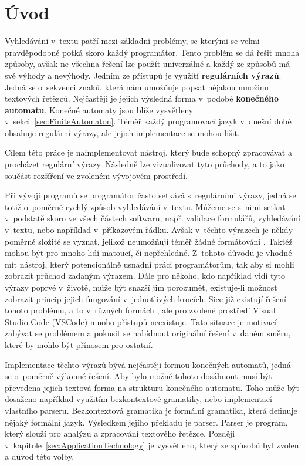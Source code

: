\chapter{Úvod}\label{sec:Introduction}

Vyhledávání v~textu patří mezi základní problémy, se kterými se velmi pravděpodobně potká skoro každý programátor. 
Tento problém se dá řešit mnoha způsoby, avšak ne všechna řešení lze použít univerzálně a každý ze způsobů má své výhody a nevýhody.
Jedním ze přístupů je využití \textbf{regulárních výrazů}. 
Jedná se o~sekvenci znaků, která nám umožňuje popsat nějakou množinu textových řetězců\cite{article_Bhatia}.
Nejčastěji je jejich výsledná forma v~podobě \textbf{konečného automatu}. 
Konečné automaty jsou blíže vysvětleny v~sekci~\ref{sec:FiniteAutomaton}.
Téměř každý programovací jazyk v~dnešní době obsahuje regulární výrazy, ale jejich implementace se mohou lišit.

Cílem této práce je naimplementovat nástroj, který bude schopný zpracovávat a procházet regulární výrazy. 
Následně lze vizualizovat tyto průchody, a to jako součást rozšíření ve zvoleném vývojovém prostředí.

Při vývoji programů se programátor často setkává s~regulárními výrazy, jedná se totiž o~poměrně rychlý způsob vyhledávání v~textu. 
Můžeme se s~nimi setkat v~podstatě skoro ve všech částech softwaru, např. validace formulářů, vyhledávání v~textu, nebo například v~příkazovém řádku.
Avšak v~těchto výrazech je někdy poměrně složité se vyznat, jelikož neumožňují téměř žádné formátování \cite{inproceedings}. 
Taktéž mohou být pro mnoho lidí matoucí, či nepřehledné.
Z~tohoto důvodu je vhodné mít nástroj, který potencionálně usnadní práci programátorům, tak aby si mohli zobrazit průchod zadaným výrazem.
Dále pro někoho, kdo například vidí tyto výrazy poprvé v~životě, může být snazší jim porozumět, existuje-li možnost zobrazit princip jejich fungování v~jednotlivých krocích.
Sice již existují řešení tohoto problému, a to v~různých formách \cite{Dib, Regexper, RegExr}, ale pro zvolené prostředí Visual Studio Code (VSCode) mnoho přístupů neexistuje.
Tato situace je motivací zabývat se problémem a pokusit se nabídnout originální řešení v~daném směru, které by mohlo být přínosem pro ostatní.

Implementace těchto výrazů bývá nejčastěji formou konečných automatů, jedná se o~poměrně výkonné řešení. 
Aby bylo možné tohoto dosáhnout musí být převedena jejich textová forma na strukturu konečného automatu.
Toho může být dosaženo například využitím bezkontextové gramatiky, nebo implementací vlastního parseru.
Bezkontextová gramatika je formální gramatika, která definuje nějaký formální jazyk\cite{GeeksforGeeks_2023}. 
Výsledkem jejího překladu je parser.
Parser je program, který slouží pro analýzu a zpracování textového řetězce\cite{Lutkevich_2022}.
Později v~kapitole~\ref{sec:ApplicationTechnology} je vysvětleno, který ze způsobů byl zvolen a důvod této volby.

